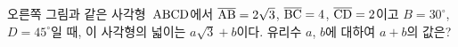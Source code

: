 \noindent\begin{minipage}[t]{0.58\linewidth}\vspace{0pt}\raggedright 오른쪽 그림과 같은 사각형~$\mathrm{ABCD}$에서 $\overline{\mathrm{AB}}=2\sqrt{3}$, $\overline{\mathrm{BC}}=4$, $\overline{\mathrm{CD}}=2$이고 $B=30^\circ$, $D=45^\circ$일 때, 이 사각형의 넓이는 $a\sqrt{3}+b$이다. 유리수 $a$, $b$에 대하여 $a+b$의 값은?\end{minipage}\hfill\begin{minipage}[t]{0.4\linewidth}\vspace{0pt}\centering \resizebox{\ifdim\width>\linewidth\linewidth\else\width\fi}{!}{}\end{minipage}\par
{}
